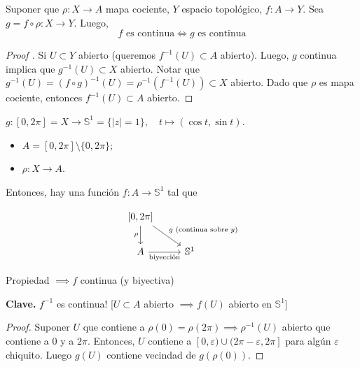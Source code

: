 \begin{property}
	Suponer que $\rho: X \to A$ mapa cociente, $Y$ espacio topológico, $f: A \to Y$. Sea $g = f \circ \rho : X \to Y$. Luego,
	\[ f \text{ es continua} \iff g \text{ es continua} \]
\end{property}
\begin{proof}[Proof ]
	\Ifstep Si $U\subset Y$ abierto (queremos $f^{-1}(U) \subset A$ abierto). Luego, $g$ continua implica que $g^{-1}(U)\subset X$ abierto. Notar que $g^{-1}(U) = (f\circ g)^{-1}(U) = \rho^{-1}(f^{-1}(U)) \subset X$ abierto. Dado que $\rho$ es mapa cociente, entonces $f^{-1}(U) \subset A$ abierto.
\end{proof}

\begin{eg}
	$g : [0,2\pi] = X \to \mathbb{S}^1 = \{|z| = 1\},\quad t \mapsto (\cos t,\sin t)$.
	\begin{itemize}
		\item $A = [0,2\pi] \setminus \{0,2\pi\}$;

		\item $\rho: X \to A$.
	\end{itemize}
	Entonces, hay una función $f: A \to \mathbb{S}^1$ tal que 

	\[
	\begin{tikzcd}
		{[0,2\pi]} \arrow[d, "\rho"'] \arrow[rd, "g \text{ (continua sobre } y)"] &              \\
		A \arrow[r, "\text{biyección}"']                                                 & \mathbb{S}^1
	\end{tikzcd}
	\]
\end{eg}

\noindent Propiedad $\implies f$ continua (y biyectiva) \newline

\noindent \textbf{Clave.} $f^{-1}$ es continua! [$U\subset A$ abierto $\implies f(U)$ abierto en $\mathbb{S}^1$]

\begin{proof}
	Suponer $U$ que contiene a $\rho(0) = \rho(2\pi) \implies \rho^{-1}(U)$ abierto que contiene a $0$ y a $2\pi$. Entonces, $U$ contiene a $[0,\varepsilon)\cup (2\pi-\varepsilon,2\pi]$ para algún $\varepsilon$ chiquito. Luego $g(U)$ contiene vecindad de $g(\rho(0))$.
\end{proof}
